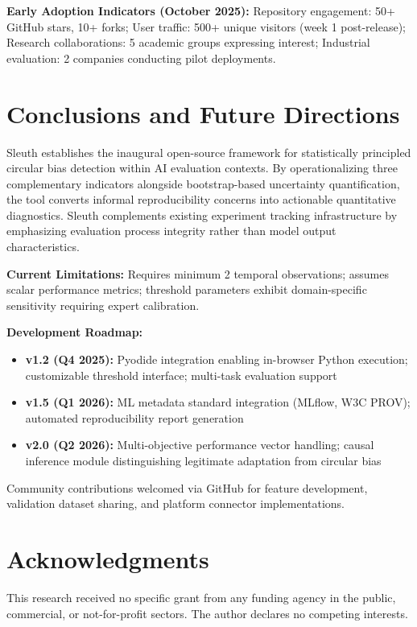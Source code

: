 \documentclass[10pt]{article}
\begin{document}
\textbf{Early Adoption Indicators (October 2025):}
Repository engagement: 50+ GitHub stars, 10+ forks; User traffic: 500+ unique visitors (week 1 post-release); Research collaborations: 5 academic groups expressing interest; Industrial evaluation: 2 companies conducting pilot deployments.

\section{Conclusions and Future Directions}

Sleuth establishes the inaugural open-source framework for statistically principled circular bias detection within AI evaluation contexts. By operationalizing three complementary indicators alongside bootstrap-based uncertainty quantification, the tool converts informal reproducibility concerns into actionable quantitative diagnostics. Sleuth complements existing experiment tracking infrastructure by emphasizing evaluation process integrity rather than model output characteristics.

\textbf{Current Limitations:} Requires minimum 2 temporal observations; assumes scalar performance metrics; threshold parameters exhibit domain-specific sensitivity requiring expert calibration.

\textbf{Development Roadmap:}
\begin{itemize}
    \item \textbf{v1.2 (Q4 2025):} Pyodide integration enabling in-browser Python execution; customizable threshold interface; multi-task evaluation support
    \item \textbf{v1.5 (Q1 2026):} ML metadata standard integration (MLflow, W3C PROV); automated reproducibility report generation
    \item \textbf{v2.0 (Q2 2026):} Multi-objective performance vector handling; causal inference module distinguishing legitimate adaptation from circular bias
\end{itemize}

Community contributions welcomed via GitHub for feature development, validation dataset sharing, and platform connector implementations.

\section*{Acknowledgments}

This research received no specific grant from any funding agency in the public, commercial, or not-for-profit sectors. The author declares no competing interests.
\end{document}
